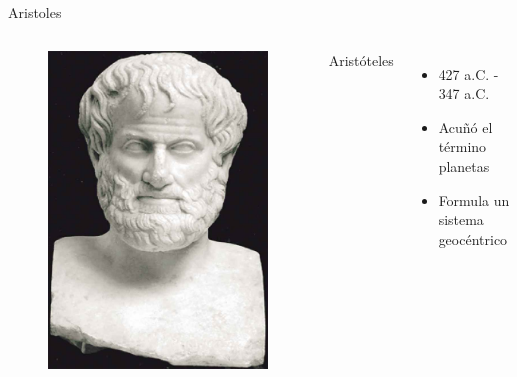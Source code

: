 \documentclass{beamer}
\begin{document}

\begin{frame}{Aristoles} 
\begin{columns}
\begin{figure}
 \centering
 \includegraphics[scale=0.2]{Imagenes/Aristoteles}
 \end{figure}
 \begin{center}
 \small
 Aristóteles 
 \end{center}
\begin{itemize}
\item 427 a.C. - 347 a.C.
\item Acuñó el término planetas
\item Formula un sistema geocéntrico
\end{itemize}
\end{columns}
\end{frame}
\end{document}
